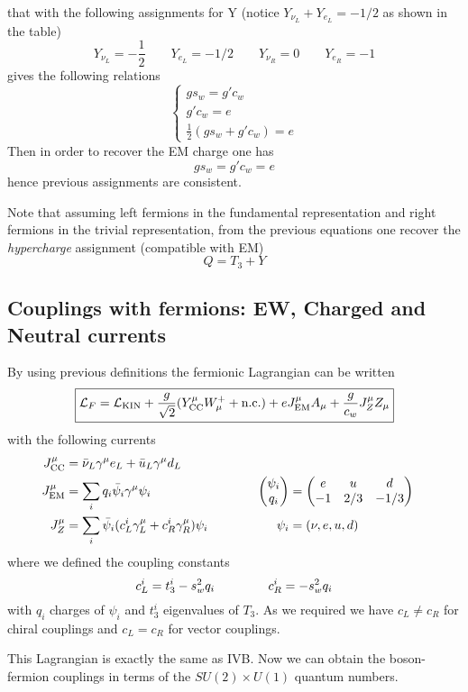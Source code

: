 \documentclass[TheoreticalPhy_ModB.tex]{subfiles}
\begin{document}
that with the following assignments for Y (notice $Y_{\nu_L}+Y_{e_L}=-1/2$ as shown in the table)
\[Y_{\nu_L}=-\frac12\qquad Y_{e_L}=-1/2\qquad Y_{\nu_R}=0\qquad Y_{e_R}=-1\]
gives the following relations
\[\begin{cases}
gs_w=g'c_w\\
g'c_w=e\\
\frac12(gs_w+g'c_w)=e
\end{cases}\]
Then in order to recover the EM charge one has
\[gs_w=g'c_w=e\]
hence previous assignments are consistent.  

Note that assuming left fermions in the fundamental representation and right fermions in the trivial representation, from the previous equations one recover the \emph{hypercharge} assignment (compatible with EM)
\[Q=T_3+Y\]

\subsection{Couplings with fermions: EW, Charged and Neutral currents}

By using previous definitions the fermionic Lagrangian can be written
\[\boxed{\mathcal L_F=\mathcal L_{\text{KIN}}+\frac g{\sqrt2}(Y_{\text{CC}}^\mu W_\mu^++\text{n.c.})+eJ_{\text{EM}}^\mu A_\mu+\frac g{c_w}J_Z^\mu Z_\mu}\]
with the following currents
\[\begin{aligned}
J_{\text{CC}}^\mu&=\bar\nu_L\gamma^\mu e_L+\bar u_L\gamma^\mu d_L\\
J_{\text{EM}}^\mu&=\sum_{i}q_i\bar\psi_i\gamma^\mu\psi_i&&&\begin{pmatrix}\psi_i\\q_i\end{pmatrix}&=\begin{pmatrix}e&u&d\\-1&2/3&-1/3\end{pmatrix}\\
J_Z^\mu&=\sum_i\bar\psi_i(c_L^i\gamma^\mu_L+c_R^i\gamma_R^\mu)\psi_i\hspace{0.7cm}&&&\psi_i&=(\nu,e,u,d)
\end{aligned}\]
where we defined the coupling constants
\[c_L^i=t_3^i-s_w^2q_i\hspace{1.5cm}c_R^i=-s_w^2q_i\]
with $q_i$ charges of $\psi_i$ and $t_3^i$ eigenvalues of $T_3$. As we required we have $c_L\neq c_R$ for chiral couplings and $c_L=c_R$ for vector couplings. 

This Lagrangian is exactly the same as IVB. Now we can obtain the boson-fermion couplings in terms of the $SU(2)\times U(1)$ quantum numbers. 
\end{document}
